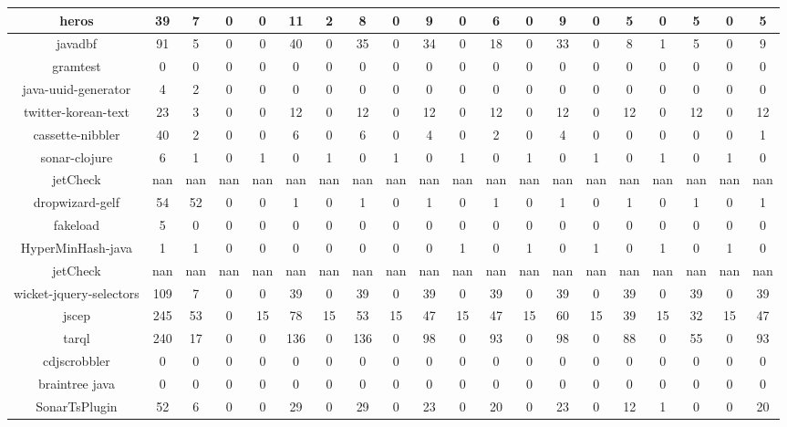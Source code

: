 \begin{table}
\begin{tabular}{|c|c|c|c|c|c|c|c|c|c|c|c|c|c|c|c|c|c|c|c|}
\hline
heros & 39 & 7 & 0 & 0 & 11 & 2 & 8 & 0 & 9 & 0 & 6 & 0 & 9 & 0 & 5 & 0 & 5 & 0 & 5 \\
\hline
javadbf & 91 & 5 & 0 & 0 & 40 & 0 & 35 & 0 & 34 & 0 & 18 & 0 & 33 & 0 & 8 & 1 & 5 & 0 & 9 \\
\hline
gramtest & 0 & 0 & 0 & 0 & 0 & 0 & 0 & 0 & 0 & 0 & 0 & 0 & 0 & 0 & 0 & 0 & 0 & 0 & 0 \\
\hline
java-uuid-generator & 4 & 2 & 0 & 0 & 0 & 0 & 0 & 0 & 0 & 0 & 0 & 0 & 0 & 0 & 0 & 0 & 0 & 0 & 0 \\
\hline
twitter-korean-text & 23 & 3 & 0 & 0 & 12 & 0 & 12 & 0 & 12 & 0 & 12 & 0 & 12 & 0 & 12 & 0 & 12 & 0 & 12 \\
\hline
cassette-nibbler & 40 & 2 & 0 & 0 & 6 & 0 & 6 & 0 & 4 & 0 & 2 & 0 & 4 & 0 & 0 & 0 & 0 & 0 & 1 \\
\hline
sonar-clojure & 6 & 1 & 0 & 1 & 0 & 1 & 0 & 1 & 0 & 1 & 0 & 1 & 0 & 1 & 0 & 1 & 0 & 1 & 0 \\
\hline
jetCheck & nan & nan & nan & nan & nan & nan & nan & nan & nan & nan & nan & nan & nan & nan & nan & nan & nan & nan & nan \\
\hline
dropwizard-gelf & 54 & 52 & 0 & 0 & 1 & 0 & 1 & 0 & 1 & 0 & 1 & 0 & 1 & 0 & 1 & 0 & 1 & 0 & 1 \\
\hline
fakeload & 5 & 0 & 0 & 0 & 0 & 0 & 0 & 0 & 0 & 0 & 0 & 0 & 0 & 0 & 0 & 0 & 0 & 0 & 0 \\
\hline
HyperMinHash-java & 1 & 1 & 0 & 0 & 0 & 0 & 0 & 0 & 0 & 1 & 0 & 1 & 0 & 1 & 0 & 1 & 0 & 1 & 0 \\
\hline
jetCheck & nan & nan & nan & nan & nan & nan & nan & nan & nan & nan & nan & nan & nan & nan & nan & nan & nan & nan & nan \\
\hline
wicket-jquery-selectors & 109 & 7 & 0 & 0 & 39 & 0 & 39 & 0 & 39 & 0 & 39 & 0 & 39 & 0 & 39 & 0 & 39 & 0 & 39 \\
\hline
jscep & 245 & 53 & 0 & 15 & 78 & 15 & 53 & 15 & 47 & 15 & 47 & 15 & 60 & 15 & 39 & 15 & 32 & 15 & 47 \\
\hline
tarql & 240 & 17 & 0 & 0 & 136 & 0 & 136 & 0 & 98 & 0 & 93 & 0 & 98 & 0 & 88 & 0 & 55 & 0 & 93 \\
\hline
cdjscrobbler & 0 & 0 & 0 & 0 & 0 & 0 & 0 & 0 & 0 & 0 & 0 & 0 & 0 & 0 & 0 & 0 & 0 & 0 & 0 \\
\hline
braintree java & 0 & 0 & 0 & 0 & 0 & 0 & 0 & 0 & 0 & 0 & 0 & 0 & 0 & 0 & 0 & 0 & 0 & 0 & 0 \\
\hline
SonarTsPlugin & 52 & 6 & 0 & 0 & 29 & 0 & 29 & 0 & 23 & 0 & 20 & 0 & 23 & 0 & 12 & 1 & 0 & 0 & 20 \\

\end{tabular}
\end{table}
